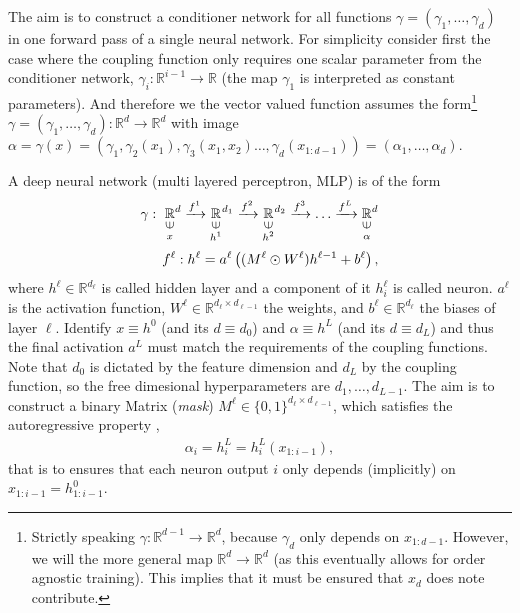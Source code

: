 \documentclass[12pt,a4paper]{article}
\newcommand{\vin}{\rotatebox[origin=c]{90}{$\in$}}
\newcommand{\cont}[2]{%
	\underset{\underset{\scriptstyle\mathstrut #2}{\vin}}{#1}%
}
\begin{document}
The aim is to construct a conditioner network for all functions $\gamma = (\gamma_1, \dots,\gamma_d)$ in one forward pass of a single neural network.
For simplicity consider first the case where the coupling function only requires one scalar parameter from the conditioner network, $\gamma_i:  \mathbb{R}^{i-1} \rightarrow \mathbb{R}$ (the map $\gamma_1$ is interpreted as constant parameters). And therefore we the vector valued function assumes the form\footnote{\label{fn:mask_dims}Strictly speaking  $\gamma:  \mathbb{R}^{d-1} \rightarrow \mathbb{R}^d$, because $\gamma_d$ only depends on $x_{1:d-1}$. However, we will the more general map $\mathbb{R}^{d} \rightarrow \mathbb{R}^d$ (as this eventually allows for order agnostic training). This implies that it must be ensured that $x_d$ does note contribute.} $\gamma = (\gamma_1, \dots,\gamma_d):  \mathbb{R}^{d} \rightarrow \mathbb{R}^d$ with image $\alpha = \gamma(x) =(\gamma_1, \gamma_2(x_1), \gamma_3(x_1,x_2) \dots, \gamma_d(x_{1:d-1}))= (\alpha_1,\dots, \alpha_d)$.

 A deep neural network (multi layered perceptron, MLP) is of the form
 \begin{align}\label{eq:masked_conditioner_nn}
 	\gamma: ~\cont{\mathbb{R}}{x}^d \xrightarrow{f^1} \cont{\mathbb{R}}{h^1}^{d_1} \xrightarrow{f^2} \cont{\mathbb{R}}{h^2}^{d_2} \xrightarrow{f^3} \dots \xrightarrow{f^L} \cont{\mathbb{R}}{\alpha}^d \nonumber 
 	\\ 
 	f^\ell: h^\ell= a^\ell\left((M^\ell\odot W^\ell)h^{\ell-1} + b^\ell\right),
 \end{align}
 where $h^\ell \in \mathbb{R}^{d_\ell}$ is called hidden layer  and a component of it $h^\ell_i$ is called neuron. $a^\ell$ is the activation function,  $W^\ell\in \mathbb{R}^{d_{\ell} \times d_{\ell-1}}$ the weights, and  $b^\ell \in \mathbb{R}^{d_\ell}$ the biases of layer $\ell$. Identify $x\equiv h^0$ (and its $d \equiv d_0$) and $\alpha \equiv h^L$ (and its $d \equiv d_L$) and thus  the final activation $a^L$ must match the requirements of the coupling functions. Note that $d_0$ is dictated by the feature dimension and $d_L$ by the coupling function, so the free dimesional hyperparameters are $d_1, \dots, d_{L-1}$. The aim is to construct a binary Matrix (\textit{mask}) $M^\ell \in \{0,1\}^{d_\ell \times  d_{\ell-1}}$, which satisfies the autoregressive property \cite{germain_2015_made}, 
 \begin{align}\label{eq:mask_autoregressive_property}
 	\alpha_i = h^L_{i} = h^L_{i}(x_{1:i-1}),
 \end{align}
 that is to ensures that each neuron output $i$  only depends (implicitly) on $x_{1:i-1} = h^0_{ 1:i-1}$.
 
\end{document}
